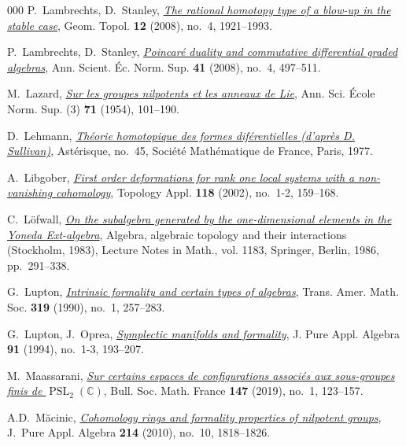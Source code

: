 \documentclass{article}
\numberwithin{equation}{section}
\theoremstyle{definition}
\renewcommand{\C}{\mathbb{C}}
\begin{document}
\begin{thebibliography}{000}
  P.~Lambrechts, D.~Stanley,
\href{https://doi.org/10.2140/gt.2008.12.1921}%
{\em The rational homotopy type of a blow-up in the stable case}, 
Geom. Topol. \textbf{12} (2008), no.~4, 1921--1993. 

  P.~Lambrechts, D.~Stanley,
\href{https://doi.org/10.24033/asens.2074}%
{\em Poincar\'{e} duality and commutative differential graded algebras},
Ann. Scient. \'{E}c. Norm. Sup. \textbf{41} (2008), no.~4, 497--511.

 M.~Lazard, 
\href{https://doi.org/10.24033/asens.1021}%
{\em Sur les groupes nilpotents et les anneaux de {L}ie}, 
Ann. Sci. \'{E}cole Norm. Sup. (3) \textbf{71} (1954), 101--190. 

  D.~Lehmann,
\href{http://www.numdam.org/item/AST_1990__45__1_0/}%
{\em Th\'{e}orie homotopique des formes dif\'{e}rentielles (d'apr\`{e}s D. Sullivan)}, 
Ast\'erisque, no.~45, Soci\'{e}t\'{e} Math\'{e}matique de France, Paris, 1977. 

  A.~Libgober,
\href{https://dx.doi.org/10.1016/S0166-8641(01)00048-7}%
{\em First order deformations for rank one local systems 
with a non-vanishing cohomology}, Topology Appl. 
\textbf{118} (2002), no.~1-2, 159--168. 

 C.~L{\"o}fwall, 
\href{https://dx.doi.org/10.1007/BFb0075468}%
{\em On the subalgebra generated by the one-dimensional elements in 
the {Y}oneda {E}xt-algebra}, Algebra, algebraic topology and their interactions
({S}tockholm, 1983), Lecture Notes in Math., vol. 1183, Springer, Berlin,
1986, pp.~291--338. 

 G.~Lupton, 
\href{https://dx.doi.org/10.2307/2001345}%
{\em Intrinsic formality and certain types of algebras}, 
Trans. Amer. Math. Soc. \textbf{319} (1990), no.~1, 257--283. 

 G.~Lupton, J.~Oprea, 
\href{https://dx.doi.org/10.1016/0022-4049(94)90142-2}%
{\em Symplectic manifolds and formality}, 
J. Pure Appl. Algebra \textbf{91} (1994), no.~1-3, 193--207.

 M.~Maassarani, 
\href{https://dx.doi.org/10.24033/bsmf.2777}
{\em Sur certains espaces de configurations associ\'{e}s aux sous-groupes 
finis de $\operatorname{PSL}_2(\C)$}, 
Bull. Soc. Math. France \textbf{147} (2019), no.~1, 123--157. 

 A.D.~M{\u{a}}cinic, 
\href{https://dx.doi.org/10.1016/j.jpaa.2009.12.025}%
{\em Cohomology rings and formality properties of nilpotent groups}, 
J.~Pure Appl. Algebra \textbf{214} (2010), no.~10, 1818--1826.


\end{thebibliography}
\end{document}
